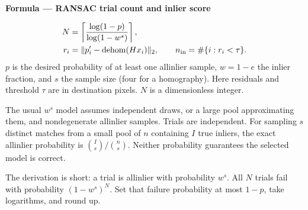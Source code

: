 \documentclass[letterpaper,11pt,english,openany,oneside]{jupyterBook}
\begin{document}
\begin{TextbookBox}
\textbf{Formula — RANSAC trial count and inlier score}\par\smallskip
\begin{equation}\label{equation:lectures/lecture02/estimation:eq-lec02-ransac}
\begin{split}\begin{aligned}
N&=\left\lceil\frac{\log(1-p)}{\log(1-w^s)}\right\rceil,\\
r_i&=\|p_i'-\operatorname{dehom}(Hx_i)\|_2,\qquad
n_{\rm in}=\#\{i:r_i<\tau\}.
\end{aligned}\end{split}
\end{equation}
\sphinxAtStartPar
\(p\) is the desired probability of at least one all\sphinxhyphen{}inlier sample, \(w=1-e\) the inlier fraction, and \(s\) the sample size (four for a homography). Here residuals and threshold \(\tau\) are in destination pixels. \(N\) is a dimensionless integer.

\sphinxAtStartPar
The usual \(w^s\) model assumes independent draws, or a large pool approximating them, and nondegenerate all\sphinxhyphen{}inlier samples. Trials are independent. For sampling \(s\) distinct matches from a small pool of \(n\) containing \(I\) true inliers, the exact all\sphinxhyphen{}inlier probability is \(\binom I s/\binom n s\). Neither probability guarantees the selected model is correct.

\end{TextbookBox}

\sphinxAtStartPar
The derivation is short: a trial is all\sphinxhyphen{}inlier with probability \(w^s\). All \(N\) trials fail with probability \((1-w^s)^N\). Set that failure probability at most \(1-p\), take logarithms, and round up.
\end{document}
